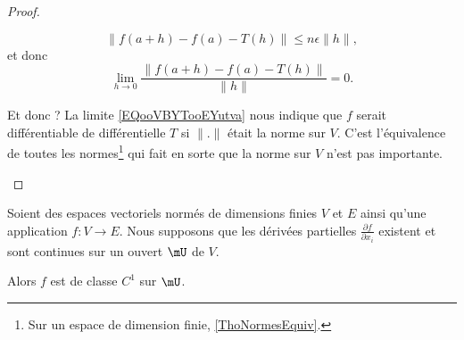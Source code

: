 \begin{proof}
\begin{subproof}
            \begin{equation}
                \| f(a+h)-f(a)-T(h) \|\leq n\epsilon\| h \|,
            \end{equation}
            et donc
            \begin{equation}        \label{EQooVBYTooEYutva}
                \lim_{h\to 0} \frac{ \| f(a+h)-f(a)-T(h) \| }{ \| h \| }=0.
            \end{equation}
        \item[Et donc ?]
            La limite \eqref{EQooVBYTooEYutva} nous indique que \( f\) serait différentiable de différentielle \( T\) si \( \| . \|\) était la norme sur \( V\). C'est l'équivalence de toutes les normes\footnote{Sur un espace de dimension finie, \ref{ThoNormesEquiv}.} qui fait en sorte que la norme sur \( V\) n'est pas importante.
    \end{subproof}
\end{proof}

\begin{proposition}     \label{PROPooUUOSooPuXJjQ}
    Soient des espaces vectoriels normés de dimensions finies \( V\) et \( E\) ainsi qu'une application \( f\colon V\to E\). Nous supposons que les dérivées partielles \( \frac{ \partial f }{ \partial x_i }\) existent et sont continues sur un ouvert \( \mU\) de \( V\).
    
    Alors \( f\) est de classe \( C^1\) sur \( \mU\).
\end{proposition}

